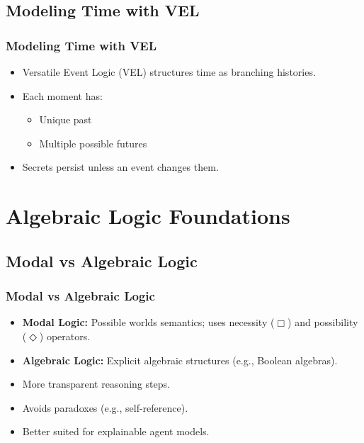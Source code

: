 \documentclass[aspectratio=169]{beamer}
\begin{document}
\subsection{Modeling Time with VEL}
\begin{frame}
\frametitle{Modeling Time with VEL}
\Large
\begin{itemize}
    \item Versatile Event Logic (VEL) structures time as branching histories.
    \item Each moment has:
    \begin{itemize}
        \Large
        \item Unique past
        \item Multiple possible futures
    \end{itemize}
    \item Secrets persist unless an event changes them.
\end{itemize}
\end{frame}


\section{Algebraic Logic Foundations}

\subsection{Modal vs Algebraic Logic}
\begin{frame}
\frametitle{Modal vs Algebraic Logic}
\Large
\begin{itemize}
    \item \textbf{Modal Logic:} Possible worlds semantics; uses necessity ($\Box$) and possibility ($\Diamond$) operators.
    \item \textbf{Algebraic Logic:} Explicit algebraic structures (e.g., Boolean algebras).
    \item More transparent reasoning steps.
    \item Avoids paradoxes (e.g., self-reference).
    \item Better suited for explainable agent models.
\end{itemize}
\end{frame}
\end{document}
